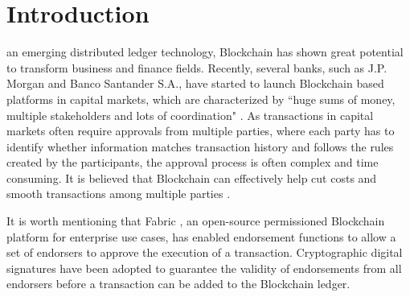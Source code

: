 \documentclass[journal]{IEEEtran}
\begin{document}
%
\IEEEpeerreviewmaketitle



\section{Introduction}
%
%
%
%
 an emerging distributed ledger technology, Blockchain \cite{08nakamoto2008bitcoin} has shown great potential to transform business and finance fields. Recently, several banks, such as J.P. Morgan and Banco Santander S.A., have started to launch Blockchain based platforms in capital markets, which are characterized by ``huge sums of money, multiple stakeholders and lots of coordination" \cite{JP_Morgan}. As transactions in capital markets often require approvals from multiple parties, where each party has to identify whether information matches transaction history and follows the rules created by the participants, the approval process is often complex and time consuming. It is believed that Blockchain can effectively help cut costs and smooth transactions among multiple parties \cite{JP_Morgan}.

It is worth mentioning that Fabric \cite{11DBLP:conf/eurosys/AndroulakiBBCCC18}, an open-source permissioned Blockchain platform for enterprise use cases, has enabled endorsement functions to allow a set of endorsers to approve the execution of a transaction. Cryptographic digital signatures have been adopted to guarantee the validity of endorsements from all endorsers before a transaction can be added to the Blockchain ledger.
\end{document}
